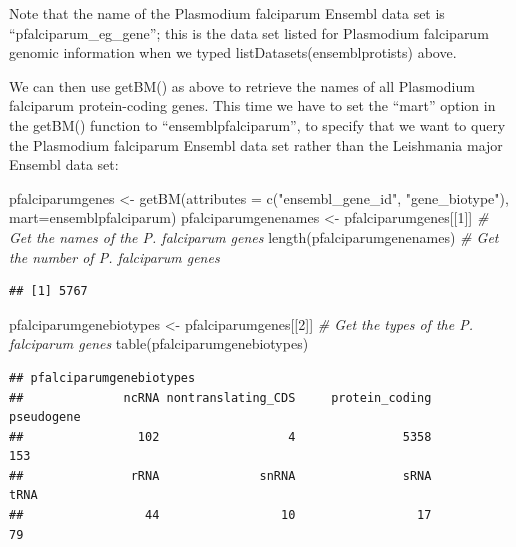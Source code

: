 \documentclass[
]{book}
\newenvironment{Shaded}{\begin{snugshade}}{\end{snugshade}}
\newcommand{\AttributeTok}[1]{\textcolor[rgb]{0.77,0.63,0.00}{#1}}
\newcommand{\CommentTok}[1]{\textcolor[rgb]{0.56,0.35,0.01}{\textit{#1}}}
\newcommand{\DecValTok}[1]{\textcolor[rgb]{0.00,0.00,0.81}{#1}}
\newcommand{\FunctionTok}[1]{\textcolor[rgb]{0.00,0.00,0.00}{#1}}
\newcommand{\NormalTok}[1]{#1}
\newcommand{\OtherTok}[1]{\textcolor[rgb]{0.56,0.35,0.01}{#1}}
\newcommand{\StringTok}[1]{\textcolor[rgb]{0.31,0.60,0.02}{#1}}
\begin{document}
Note that the name of the Plasmodium falciparum Ensembl data set is ``pfalciparum\_eg\_gene''; this is the data set listed for Plasmodium falciparum genomic information when we typed listDatasets(ensemblprotists) above.

We can then use getBM() as above to retrieve the names of all Plasmodium falciparum protein-coding genes. This time we have to set the ``mart'' option in the getBM() function to ``ensemblpfalciparum'', to specify that we want to query the Plasmodium falciparum Ensembl data set rather than the Leishmania major Ensembl data set:

\begin{Shaded}
\begin{Highlighting}[]
\NormalTok{pfalciparumgenes }\OtherTok{\textless{}{-}} \FunctionTok{getBM}\NormalTok{(}\AttributeTok{attributes =} \FunctionTok{c}\NormalTok{(}\StringTok{"ensembl\_gene\_id"}\NormalTok{, }\StringTok{"gene\_biotype"}\NormalTok{), }\AttributeTok{mart=}\NormalTok{ensemblpfalciparum)}
\NormalTok{pfalciparumgenenames }\OtherTok{\textless{}{-}}\NormalTok{ pfalciparumgenes[[}\DecValTok{1}\NormalTok{]] }\CommentTok{\# Get the names of the P. falciparum genes}
\FunctionTok{length}\NormalTok{(pfalciparumgenenames)                  }\CommentTok{\# Get the number of P. falciparum genes}
\end{Highlighting}
\end{Shaded}

\begin{verbatim}
## [1] 5767
\end{verbatim}

\begin{Shaded}
\begin{Highlighting}[]
\NormalTok{pfalciparumgenebiotypes }\OtherTok{\textless{}{-}}\NormalTok{ pfalciparumgenes[[}\DecValTok{2}\NormalTok{]] }\CommentTok{\# Get the types of the P. falciparum genes}
\FunctionTok{table}\NormalTok{(pfalciparumgenebiotypes)}
\end{Highlighting}
\end{Shaded}

\begin{verbatim}
## pfalciparumgenebiotypes
##              ncRNA nontranslating_CDS     protein_coding         pseudogene 
##                102                  4               5358                153 
##               rRNA              snRNA               sRNA               tRNA 
##                 44                 10                 17                 79
\end{verbatim}
\end{document}

